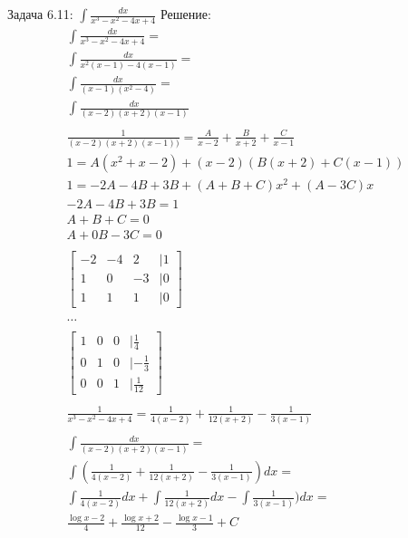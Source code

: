 \documentclass[a4paper, 20pt, fleqn, border=2pt]{article}
\begin{document}
\begin{enumerate}
Задача 6.11: $\int \frac{dx}{x^3 - x^2 - 4x + 4}$
Решение:
\begin{equation}
\begin{split}
    \int \frac{dx}{x^3 - x^2 - 4x + 4} = \\
    \int \frac{dx}{x^2(x - 1) - 4(x - 1)} = \\
    \int \frac{dx}{(x - 1)(x^2 - 4)} = \\
    \int \frac{dx}{(x - 2)(x + 2)(x - 1)} \\
    \\
    \frac{1}{(x - 2)(x + 2)(x - 1))} = \frac{A}{x - 2} + \frac{B}{x + 2} + \frac{C}{x - 1} \\
    1 = A(x^2 + x - 2) + (x - 2)(B(x + 2) + C(x -1)) \\
    1 = - 2A - 4B + 3B + (A + B + C)x^2 + (A - 3C)x \\
    -2A -4B +3B = 1 \\
    A + B + C = 0 \\
    A + 0B - 3C = 0 \\
    \\
    \begin{bmatrix}
        -2 & -4 & 2 & | 1 \\
        1 & 0 & -3 & | 0 \\
        1 & 1 & 1 & | 0
    \end{bmatrix}
    \\
    \\
    \dots
    \\
    \\
    \begin{bmatrix}
        1 & 0 & 0 & | \frac{1}{4} \\
        0 & 1 & 0 & | -\frac{1}{3} \\
        0 & 0 & 1 & | \frac{1}{12}
    \end{bmatrix} \\
    \\
    \frac{1}{x^3 - x^2 - 4x + 4} = \frac{1}{4(x - 2)} + \frac{1}{12(x + 2)} - \frac{1}{3(x - 1)} \\
    \\
    \int \frac{dx}{(x - 2)(x + 2)(x - 1)} = \\
    \int (\frac{1}{4(x - 2)} + \frac{1}{12(x + 2)} - \frac{1}{3(x - 1)}) dx = \\
    \int \frac{1}{4(x - 2)}dx + \int \frac{1}{12(x + 2)}dx - \int \frac{1}{3(x - 1)})dx = \\
    \frac{\log{x - 2}}{4} + \frac{\log{x + 2}}{12} - \frac{\log{x - 1}}{3} + C
\end{split}
\end{equation}


\end{enumerate}
\end{document}
